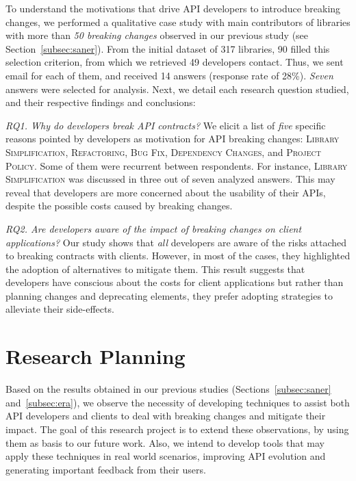 \documentclass[11pt, a4paper]{article}
\begin{document}
To understand the motivations that drive API developers to introduce breaking changes, we performed a qualitative case study with main contributors of libraries with more than \emph{50 breaking changes} observed in our previous study (see Section~\ref{subsec:saner}).
From the initial dataset of 317 libraries, 90 filled this selection criterion, from which we retrieved 49 developers contact.
Thus, we sent email for each of them, and received 14 answers (response rate of 28\%). 
\emph{Seven} answers were selected for analysis.
Next, we detail each research question studied, and their respective findings and conclusions: 

\vspace{0.2cm}

\noindent\emph{RQ1. Why do developers break API contracts?}
We elicit a list of \emph{five} specific reasons pointed by developers as motivation for API breaking changes: \textsc{Library Simplification}, \textsc{Refactoring}, \textsc{Bug Fix}, \textsc{Dependency Changes}, and \textsc{Project Policy}.
Some of them were recurrent between respondents.
For instance, \textsc{Library Simplification} was discussed in three out of seven analyzed answers.
This may reveal that developers are more concerned about the usability of their APIs, despite the possible costs caused by breaking changes.

\vspace{0.2cm}

\noindent\emph{RQ2. Are developers aware of the impact of breaking changes on client applications?}
Our study shows that \emph{all} developers are aware of the risks attached to breaking contracts with clients.
However, in most of the cases, they highlighted the adoption of alternatives to mitigate them.
This result suggests that developers have conscious about the costs for client applications but rather than planning changes and deprecating elements, they prefer adopting strategies to alleviate their side-effects.

\section{Research Planning} 
\label{sec:proposal}

Based on the results obtained in our previous studies (Sections~\ref{subsec:saner} and~\ref{subsec:era}), we observe the necessity of developing  techniques to assist both API developers and clients to deal with breaking changes and mitigate their impact.
The goal of this research project is to extend these observations, by using them as basis to our future work.
Also, we intend to develop tools that may apply these techniques in real world scenarios, improving API evolution and generating important feedback from their users.
\end{document}
